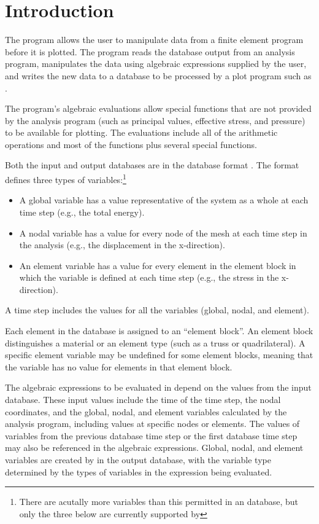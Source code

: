 \chapter{Introduction} \label{chap:intro}

The \caps{\PROGRAM} program allows the user to manipulate data from a
finite element program before it is plotted. The program reads the
database output from an analysis program, manipulates the data using 
algebraic expressions supplied by the user, and writes the new data to a
database to be processed by a plot program such as 
\cite{bib:blot}.

The program's algebraic evaluations allow special functions that are not
provided by the analysis program (such as principal values, effective
stress, and pressure) to be available for plotting. The evaluations
include all of the  arithmetic operations and most of the
 functions plus several special functions.

Both the input and output databases are in the \exo{} database
format \cite{bib:exodus}. The \exo{} format defines three types of
variables:\footnote{There are acutally more variables than this
  permitted in an \exo{} database, but only the three below are
  currently supported by \caps{\PROGRAM}}
\setlength{\itemsep}{\medskipamount} \begin{itemize}
\item
A global variable has a value representative of the system as a whole
at each time step (e.g., the total energy).
\item
A nodal variable has a value for every node of the mesh at each time
step in the analysis (e.g., the displacement in the x-direction).
\item
An element variable has a value for every element in the element block
in which the variable is defined at each time step (e.g., the stress in the
x-direction).  

\end{itemize}

A time step includes the values for all the variables (global, nodal, and element).

Each element in the database is assigned to an ``element block''. An
element block distinguishes a material or an element type (such as a
truss or quadrilateral). A specific element variable may be undefined
for some element blocks, meaning that the variable has no value for
elements in that element block.

The algebraic expressions to be evaluated in \caps{\PROGRAM} depend on
the values from the input database. These input values include the time
of the time step, the nodal coordinates, and the global, nodal,
and element variables calculated by the analysis program, including
values at specific nodes or elements. The values of variables from the
previous database time step or the first database time step may also be
referenced in the algebraic expressions. Global, nodal, and
element variables are created by \caps{\PROGRAM} in the output database,
with the variable type determined by the types of variables in the
expression being evaluated.

